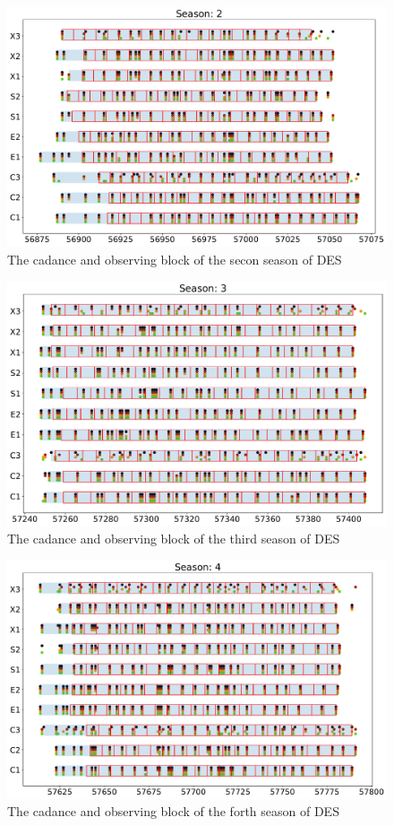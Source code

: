 \begin{figure}[h]
  \includegraphics[width=\textwidth]{Figures/Chapter5/ObsBlock_Season2.pdf}
  \caption{The cadance and observing block of the secon season of DES}
  \label{fig:ObsBlock2}
\end{figure}

\begin{figure}[h]
\includegraphics[width=\textwidth]{Figures/Chapter5/ObsBlock_Season3.pdf}
  \caption{The cadance and observing block of the third season of DES}
  \label{fig:ObsBlock3}
\end{figure}

\begin{figure}[h]
  \includegraphics[width=\textwidth]{Figures/Chapter5/ObsBlock_Season4.pdf}
  \caption{The cadance and observing block of the forth season of DES}
  \label{fig:ObsBlock4}
\end{figure}

